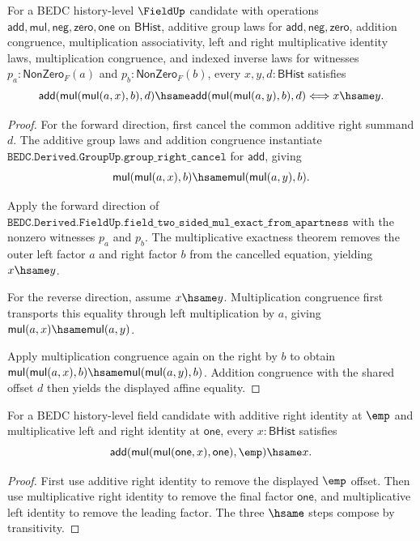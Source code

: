 \begin{theorem}
\label{thm:field-affine-two-sided-map-classifier-exact-from-apartness}
For a BEDC history-level $\FieldUp$ candidate with operations
$\mathsf{add},\mathsf{mul},\mathsf{neg},\mathsf{zero},\mathsf{one}$ on
$\mathsf{BHist}$, additive group laws for
$\mathsf{add},\mathsf{neg},\mathsf{zero}$, addition congruence,
multiplication associativity, left and right multiplicative identity laws,
multiplication congruence, and indexed inverse laws for witnesses
$p_a:\mathsf{NonZero}_F(a)$ and $p_b:\mathsf{NonZero}_F(b)$, every
$x,y,d:\mathsf{BHist}$ satisfies
$$
\mathsf{add}(\mathsf{mul}(\mathsf{mul}(a,x),b),d)\hsame
\mathsf{add}(\mathsf{mul}(\mathsf{mul}(a,y),b),d)
\Longleftrightarrow
x\hsame y.
$$
\end{theorem}
\begin{proof}
For the forward direction, first cancel the common additive right summand $d$.
The additive group laws and
addition congruence instantiate
$\texttt{BEDC.Derived.GroupUp.group\_right\_cancel}$ for $\mathsf{add}$, giving
$$
\mathsf{mul}(\mathsf{mul}(a,x),b)\hsame
\mathsf{mul}(\mathsf{mul}(a,y),b).
$$

Apply the forward direction of
$\texttt{BEDC.Derived.FieldUp.field\_two\_sided\_mul\_exact\_from\_apartness}$
with the nonzero witnesses $p_a$ and $p_b$. The multiplicative exactness theorem
removes the outer left factor $a$ and right factor $b$ from the cancelled
equation, yielding $x\hsame y$.

For the reverse direction, assume $x\hsame y$. Multiplication congruence first
transports this equality through left multiplication by $a$, giving
$\mathsf{mul}(a,x)\hsame\mathsf{mul}(a,y)$.

Apply multiplication congruence again on the right by $b$ to obtain
$\mathsf{mul}(\mathsf{mul}(a,x),b)\hsame
\mathsf{mul}(\mathsf{mul}(a,y),b)$. Addition congruence with the shared offset
$d$ then yields the displayed affine equality.
\end{proof}

\begin{theorem}
\label{thm:field-affine-identity-endpoint}
For a BEDC history-level field candidate with additive right identity at
$\emp$ and multiplicative left and right identity at $\mathsf{one}$, every
$x:\mathsf{BHist}$ satisfies
$$
\mathsf{add}(\mathsf{mul}(\mathsf{mul}(\mathsf{one},x),\mathsf{one}),\emp)
\hsame x.
$$
\end{theorem}
\begin{proof}
First use additive right identity to remove the displayed $\emp$ offset. Then
use multiplicative right identity to remove the final factor
$\mathsf{one}$, and multiplicative left identity to remove the leading factor.
The three $\hsame$ steps compose by transitivity.
\end{proof}

